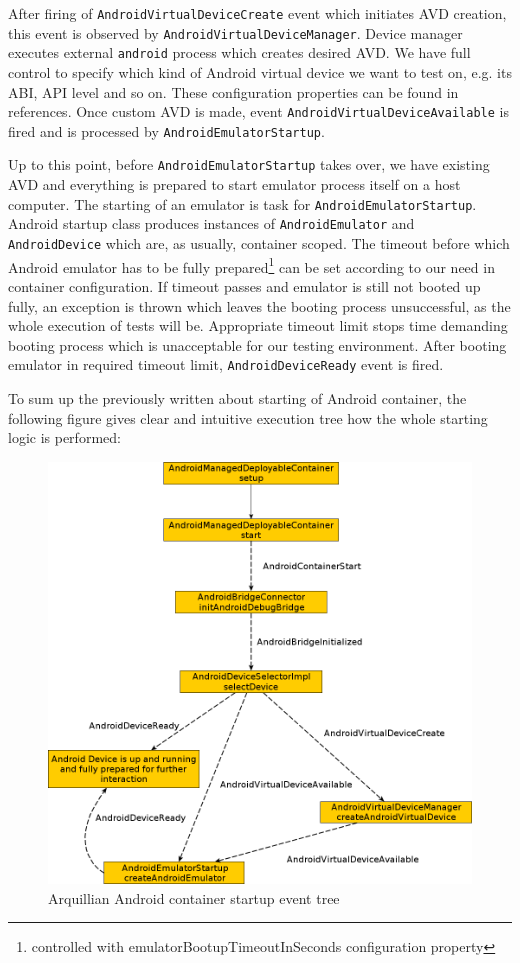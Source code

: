 \documentclass[12pt,final,oneside]{fithesis}
\begin{document}
After firing of \texttt{AndroidVirtualDeviceCreate} event which initiates AVD creation, this event is observed by \texttt{AndroidVirtualDeviceManager}. Device manager executes external \texttt{android} process which creates desired AVD. We have full control to specify which kind of Android virtual device we want to test on, e.g. its ABI, API level and so on. These configuration properties can be found in references. Once custom AVD is made, event \texttt{AndroidVirtualDeviceAvailable} is fired and is processed by \texttt{AndroidEmulatorStartup}.

Up to this point, before \texttt{AndroidEmulatorStartup} takes over, we have existing AVD and everything is prepared to start emulator process itself on a host computer. The starting of an emulator is task for \texttt{AndroidEmulatorStartup}. Android startup class produces instances of \texttt{AndroidEmulator} and \texttt{AndroidDevice} which are, as usually, container scoped. The timeout before which Android emulator has to be fully prepared\footnote{controlled with emulatorBootupTimeoutInSeconds configuration property} can be set according to our need in container configuration. If timeout passes and emulator is still not booted up fully, an exception is thrown which leaves the booting process unsuccessful, as the whole execution of tests will be. Appropriate timeout limit stops time demanding booting process which is unacceptable for our testing environment. After booting emulator in required timeout limit, \texttt{AndroidDeviceReady} event is fired.

To sum up the previously written about starting of Android container, the following figure gives clear and intuitive execution tree how the whole starting logic is performed:

\begin{figure}[!ht]
	\centering
	\includegraphics[width=120mm]{img/container-startup.png}
	\caption{Arquillian Android container startup event tree}
	\label{fig:container_startup}
\end{figure}
\end{document}
